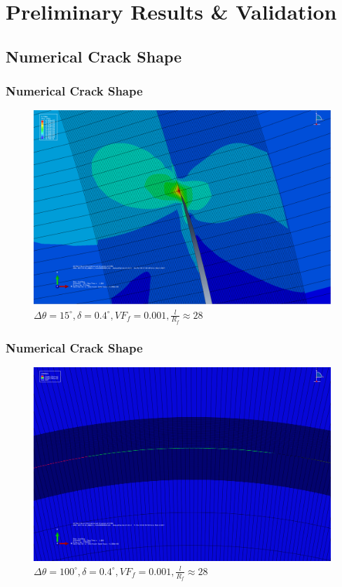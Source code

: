 \documentclass[first,firstsupp,lastsupp,handout,last,hyperref,table]{ETHclass}
\begin{document}
\section[Validation]{Preliminary Results \& Validation}

\subsection[Crack Shape]{Numerical Crack Shape}

\begin{frame}
\frametitle{Numerical Crack Shape}
\vspace{-0.35cm}
\centering
\captionsetup[subfigure]{font=scriptsize,labelfont=scriptsize}
\begin{figure}[!h]
\centering
\includegraphics[height=0.7\textheight]{abq-crack-theta-15.png}
 \caption{$\Delta\theta=15^{\circ},\delta=0.4^{\circ},VF_{f}=0.001,\frac{l}{R_{f}}\approx28$}
  \label{fig:crack15}
\end{figure}
\end{frame}

\begin{frame}
\frametitle{Numerical Crack Shape}
\vspace{-0.35cm}
\centering
\captionsetup[subfigure]{font=scriptsize,labelfont=scriptsize}
\begin{figure}[!h]
\centering
\includegraphics[height=0.7\textheight]{abq-crack-theta-100.png}
 \caption{$\Delta\theta=100^{\circ},\delta=0.4^{\circ},VF_{f}=0.001,\frac{l}{R_{f}}\approx28$}
  \label{fig:crack100}
\end{figure}
\end{frame}
\end{document}
